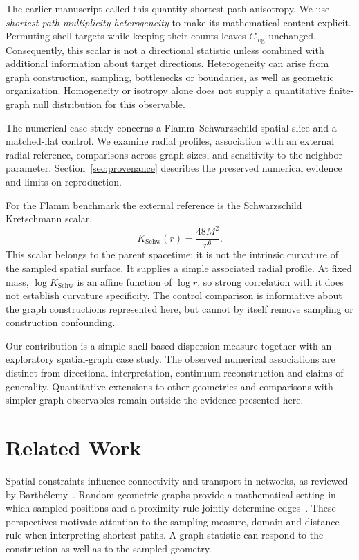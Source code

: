 \documentclass[11pt,a4paper]{article}
\begin{document}
The earlier manuscript called this quantity shortest-path anisotropy. We use \emph{shortest-path multiplicity heterogeneity} to make its mathematical content explicit. Permuting shell targets while keeping their counts leaves $C_{\log}$ unchanged. Consequently, this scalar is not a directional statistic unless combined with additional information about target directions. Heterogeneity can arise from graph construction, sampling, bottlenecks or boundaries, as well as geometric organization. Homogeneity or isotropy alone does not supply a quantitative finite-graph null distribution for this observable.

The numerical case study concerns a Flamm--Schwarzschild spatial slice and a matched-flat control. We examine radial profiles, association with an external radial reference, comparisons across graph sizes, and sensitivity to the neighbor parameter. Section~\ref{sec:provenance} describes the preserved numerical evidence and limits on reproduction.

For the Flamm benchmark the external reference is the Schwarzschild Kretschmann scalar,
\begin{equation}
K_{\mathrm{Schw}}(r)=\frac{48M^2}{r^6}.
\end{equation}
This scalar belongs to the parent spacetime; it is not the intrinsic curvature of the sampled spatial surface. It supplies a simple associated radial profile. At fixed mass, $\log K_{\mathrm{Schw}}$ is an affine function of $\log r$, so strong correlation with it does not establish curvature specificity. The control comparison is informative about the graph constructions represented here, but cannot by itself remove sampling or construction confounding.

Our contribution is a simple shell-based dispersion measure together with an exploratory spatial-graph case study. The observed numerical associations are distinct from directional interpretation, continuum reconstruction and claims of generality. Quantitative extensions to other geometries and comparisons with simpler graph observables remain outside the evidence presented here.

\section{Related Work}
Spatial constraints influence connectivity and transport in networks, as reviewed by Barth\'elemy~\cite{Barthelemy2011}. Random geometric graphs provide a mathematical setting in which sampled positions and a proximity rule jointly determine edges~\cite{Penrose2003}. These perspectives motivate attention to the sampling measure, domain and distance rule when interpreting shortest paths. A graph statistic can respond to the construction as well as to the sampled geometry.
\end{document}
